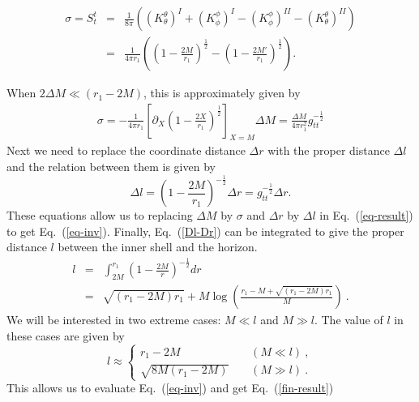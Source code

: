 \documentclass[aps,showpacs,onecolumn,floats,prd,superscriptaddress,nofootinbib]{revtex4-1}
\begin{document}
\begin{eqnarray}
	\sigma = S^t_t & = & \frac{1}{8 \pi} ((K^\theta_\theta)^{I} + (K^\phi_{\phi})^{I} - (K^\phi_\phi)^{II} - (K^\theta_\theta)^{II})	\nonumber	\\
	& = & \frac{1}{4 \pi r_1} \left( \left( 1 - \frac{2M}{r_1} \right)^\frac{1}{2} - \left( 1 - \frac{2M'}{r_1} \right)^\frac{1}{2} \right).
\end{eqnarray}

When $2\Delta M \ll (r_1-2M)$, this is approximately given by 
\begin{eqnarray}
	\sigma  =  -\frac{1}{4 \pi r_1} \left[ \partial_X \left( 1 - \frac{2X}{r_1} \right)^\frac{1}{2} \right]_{X = M} \Delta M
	 =  \frac{\Delta M}{4 \pi r_1^2} g_{tt}^{-\frac{1}{2}}	\label{sig-Dm}
\end{eqnarray}
Next we need to replace the coordinate distance $\Delta r$ with the proper distance $\Delta l$ and the relation between them is given by
\begin{equation}
	\Delta l = \left( 1 - \frac{2M}{r_1} \right)^{-\frac{1}{2}} \Delta r = g_{tt}^{-\frac{1}{2}} \Delta r.	\label{Dl-Dr}
\end{equation}
These equations allow us to replacing $\Delta M$ by $\sigma$ and $\Delta r$ by $\Delta l$ in Eq.~(\ref{eq-result}) to get Eq.~(\ref{eq-inv}). Finally, Eq.~(\ref{Dl-Dr}) can be integrated to give the proper distance $l$ between the inner shell and the horizon.
\begin{eqnarray}
	l & = & \int^{r_1}_{2M} \left( 1 - \frac{2M}{r} \right)^{-\frac{1}{2}} dr	\nonumber	\\
	& = & \sqrt{(r_1 - 2M)r_1} + M \log \left( \frac{ r_1 - M + \sqrt{(r_1 - 2M)r_1}}{M} \right)	~.
	\label{l-r}
\end{eqnarray}
We will be interested in two extreme cases: $M \ll l$ and $M \gg l$. The value of $l$ in these cases are given by
\begin{equation}
l \approx \begin{cases}
 r_1 - 2M & \ \ \ \ \ (M \ll l)~,	\\
 \sqrt{8M(r_1 - 2M)} & \ \ \ \ \ (M \gg l)~.
\end{cases}	
\end{equation}
This allows us to evaluate Eq.~(\ref{eq-inv}) and get Eq.~(\ref{fin-result})
\end{document}
